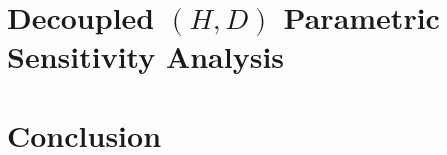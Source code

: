 \documentclass[conference]{IEEEtran}
\begin{document}
\section{Decoupled $(H, D)$ Parametric Sensitivity Analysis}\label{sec:sensitivity}

\section{Conclusion}\label{sec:conclusion}



\end{document}
